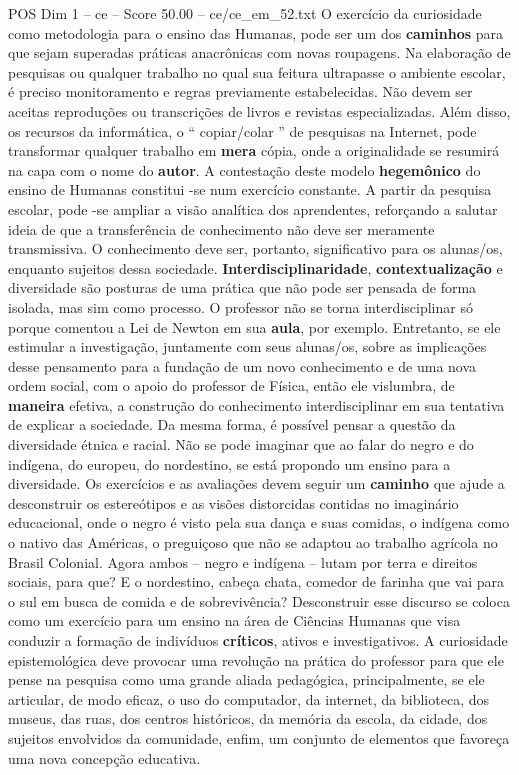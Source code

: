 \begin{textsample}{POS Dim 1 – ce – Score 50.00 – ce/ce\_em\_52.txt}
O exercício da curiosidade como metodologia para o ensino das Humanas, pode ser um dos \textbf{caminhos} para que sejam superadas práticas anacrônicas com novas roupagens.
Na elaboração de pesquisas ou qualquer trabalho no qual sua feitura ultrapasse o ambiente escolar, é preciso monitoramento e regras previamente estabelecidas.
Não devem ser aceitas reproduções ou transcrições de livros e revistas especializadas.
Além disso, os recursos da informática, o “ copiar/colar ” de pesquisas na Internet, pode transformar qualquer trabalho em \textbf{mera} cópia, onde a originalidade se resumirá na capa com o nome do \textbf{autor}.
A contestação deste modelo \textbf{hegemônico} do ensino de Humanas constitui -se num exercício constante.
A partir da pesquisa escolar, pode -se ampliar a visão analítica dos aprendentes, reforçando a salutar ideia de que a transferência de conhecimento não deve ser meramente transmissiva.
O conhecimento deve ser, portanto, significativo para os alunas/os, enquanto sujeitos dessa sociedade. \textbf{Interdisciplinaridade}, \textbf{contextualização} e diversidade são posturas de uma prática que não pode ser pensada de forma isolada, mas sim como processo.
O professor não se torna interdisciplinar só porque comentou a Lei de Newton em sua \textbf{aula}, por exemplo.
Entretanto, se ele estimular a investigação, juntamente com seus alunas/os, sobre as implicações desse pensamento para a fundação de um novo conhecimento e de uma nova ordem social, com o apoio do professor de Física, então ele vislumbra, de \textbf{maneira} efetiva, a construção do conhecimento interdisciplinar em sua tentativa de explicar a sociedade.
Da mesma forma, é possível pensar a questão da diversidade étnica e racial.
Não se pode imaginar que ao falar do negro e do indígena, do europeu, do nordestino, se está propondo um ensino para a diversidade.
Os exercícios e as avaliações devem seguir um \textbf{caminho} que ajude a desconstruir os estereótipos e as visões distorcidas contidas no imaginário educacional, onde o negro é visto pela sua dança e suas comidas, o indígena como o nativo das Américas, o preguiçoso que não se adaptou ao trabalho agrícola no Brasil Colonial.
Agora ambos – negro e indígena – lutam por terra e direitos sociais, para que?
E o nordestino, cabeça chata, comedor de farinha que vai para o sul em busca de comida e de sobrevivência?
Desconstruir esse discurso se coloca como um exercício para um ensino na área de Ciências Humanas que visa conduzir a formação de indivíduos \textbf{críticos}, ativos e investigativos.
A curiosidade epistemológica deve provocar uma revolução na prática do professor para que ele pense na pesquisa como uma grande aliada pedagógica, principalmente, se ele articular, de modo eficaz, o uso do computador, da internet, da biblioteca, dos museus, das ruas, dos centros históricos, da memória da escola, da cidade, dos sujeitos envolvidos da comunidade, enfim, um conjunto de elementos que favoreça uma nova concepção educativa.

\end{textsample}
